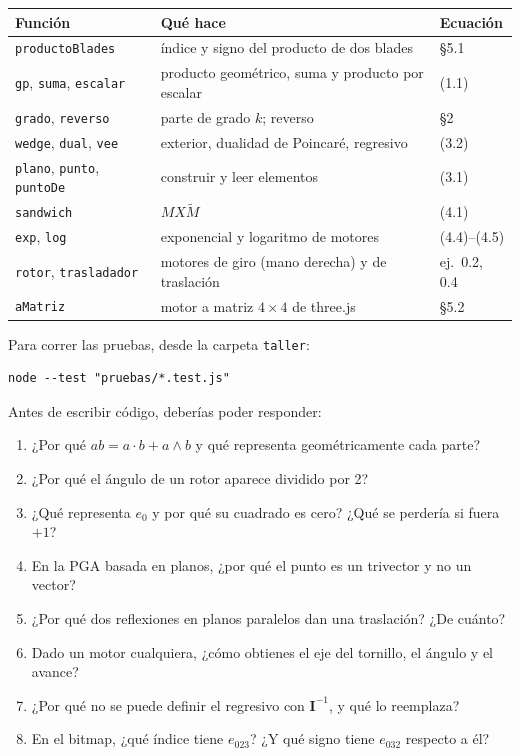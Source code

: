 \documentclass[11pt,a4paper]{article}
\numberwithin{equation}{section}
\newcommand{\rev}[1]{\widetilde{#1}}
\newcommand{\I}{\mathbf{I}}
\begin{document}
\begin{tabularx}{\linewidth}{@{}l Y l@{}}
\toprule
\textbf{Función} & \textbf{Qué hace} & \textbf{Ecuación}\\
\midrule
\texttt{productoBlades} & índice y signo del producto de dos blades & §5.1\\
\texttt{gp}, \texttt{suma}, \texttt{escalar} & producto geométrico, suma y producto por escalar & (1.1)\\
\texttt{grado}, \texttt{reverso} & parte de grado $k$; reverso & §2\\
\texttt{wedge}, \texttt{dual}, \texttt{vee} & exterior, dualidad de Poincaré, regresivo & (3.2)\\
\texttt{plano}, \texttt{punto}, \texttt{puntoDe} & construir y leer elementos & (3.1)\\
\texttt{sandwich} & $M X \rev M$ & (4.1)\\
\texttt{exp}, \texttt{log} & exponencial y logaritmo de motores & (4.4)--(4.5)\\
\texttt{rotor}, \texttt{trasladador} & motores de giro (mano derecha) y de traslación & ej.~0.2, 0.4\\
\texttt{aMatriz} & motor a matriz $4\times4$ de three.js & §5.2\\
\bottomrule
\end{tabularx}

\medskip
Para correr las pruebas, desde la carpeta \texttt{taller}:
\begin{lstlisting}
node --test "pruebas/*.test.js"
\end{lstlisting}

\begin{control}
Antes de escribir código, deberías poder responder:
\begin{enumerate}[leftmargin=*]
  \item ¿Por qué $ab = a\cdot b + a\wedge b$ y qué representa geométricamente cada parte?
  \item ¿Por qué el ángulo de un rotor aparece dividido por 2?
  \item ¿Qué representa $e_0$ y por qué su cuadrado es cero? ¿Qué se perdería si fuera $+1$?
  \item En la PGA basada en planos, ¿por qué el punto es un trivector y no un vector?
  \item ¿Por qué dos reflexiones en planos paralelos dan una traslación? ¿De cuánto?
  \item Dado un motor cualquiera, ¿cómo obtienes el eje del tornillo, el ángulo y el avance?
  \item ¿Por qué no se puede definir el regresivo con $\I^{-1}$, y qué lo reemplaza?
  \item En el bitmap, ¿qué índice tiene $e_{023}$? ¿Y qué signo tiene $e_{032}$ respecto a él?
\end{enumerate}
\end{control}
\end{document}
